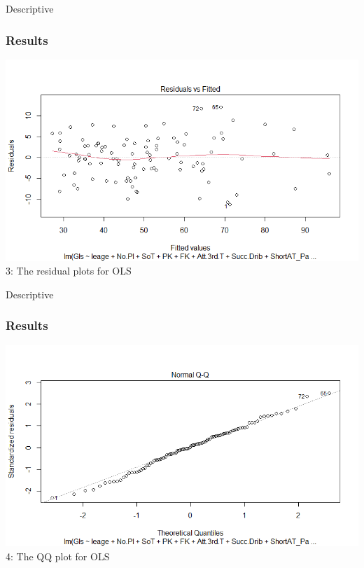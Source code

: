 \documentclass[11pt]{beamer}
\begin{document}
\begin{frame}{Descriptive}
	\frametitle{Results}
	\includegraphics[scale=0.5]{gls2}
	\figurename 3: The residual plots for OLS
\end{frame}

\begin{frame}{Descriptive}
	\frametitle{Results}
	\includegraphics[scale=0.5]{gls3}
	\figurename 4: The QQ plot for OLS
\end{frame}
	
\end{document}
